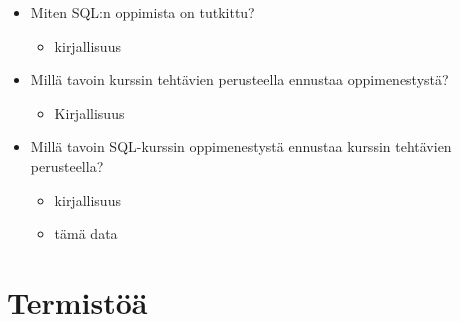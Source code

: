 \documentclass[finnish,twoside,openright]{HYgraduMLDS}
\begin{document}
\begin{itemize}
    \item Miten SQL:n oppimista on tutkittu?
    \begin{itemize}
        \item kirjallisuus
    \end{itemize}
    \item Millä tavoin kurssin tehtävien perusteella ennustaa oppimenestystä?
    \begin{itemize}
        \item Kirjallisuus
    \end{itemize}
    \item Millä tavoin SQL-kurssin oppimenestystä ennustaa kurssin tehtävien perusteella?
    \begin{itemize}
        \item kirjallisuus
        \item tämä data
    \end{itemize}
\end{itemize}


\chapter{Termistöä}
\end{document}

